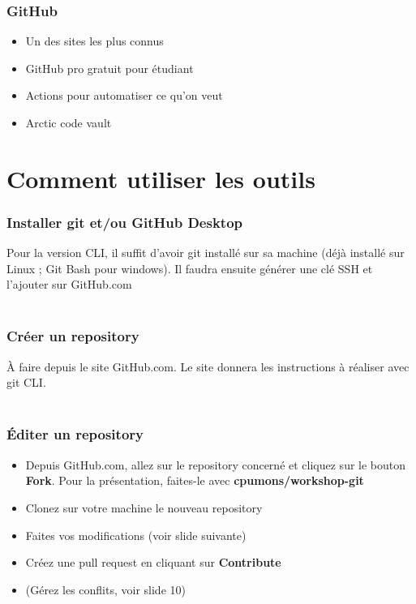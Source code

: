 \documentclass{beamer}
\begin{document}

\begin{frame}\frametitle{GitHub}
\begin{itemize}
    \item Un des sites les plus connus
    \item GitHub pro gratuit pour étudiant
    \item Actions pour automatiser ce qu'on veut
    \item Arctic code vault
\end{itemize}
\end{frame}

\section{Comment utiliser les outils} %

\begin{frame}\frametitle{Installer git et/ou GitHub Desktop}
    Pour la version CLI, il suffit d'avoir git installé sur sa machine (déjà installé sur Linux ; Git Bash pour windows). Il faudra ensuite générer une clé SSH et l'ajouter sur GitHub.com \\~\\
\end{frame}


\begin{frame}\frametitle{Créer un repository}
    À faire depuis le site GitHub.com. Le site donnera les instructions à réaliser avec git CLI. \\~\\
\end{frame}


\begin{frame}\frametitle{Éditer un repository}
    \begin{itemize}
    \item Depuis GitHub.com, allez sur le repository concerné et cliquez sur le bouton \textbf{Fork}. Pour la présentation, faites-le avec \textbf{cpumons/workshop-git}\\
        \item Clonez sur votre machine le nouveau repository \\
        \item Faites vos modifications (voir slide suivante) \\
        \item Créez une pull request en cliquant sur \textbf{Contribute}
        \item (Gérez les conflits, voir slide 10)
    \end{itemize}
\end{frame}
\end{document}
